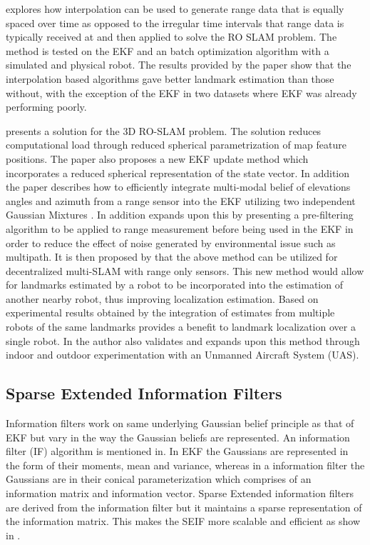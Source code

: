 \documentclass[conference]{IEEEtran}
\begin{document}
	
	
	
	\cite{Kehagias2006} explores how interpolation can be used to generate range data that is equally spaced over time as opposed to the irregular time intervals that range data is typically received at and then applied to solve the RO SLAM problem. The method is tested on the EKF and an batch optimization algorithm with a simulated and physical robot. The results provided by the paper show that the interpolation based algorithms gave better landmark estimation than those without, with the exception of the EKF in two datasets where EKF was already performing poorly.
	
	
	
	
	
	\cite{Fabresse2013} presents a solution for the 3D RO-SLAM problem. The solution reduces computational load through reduced spherical parametrization of map feature positions. The paper also proposes a new EKF update method which incorporates a reduced spherical representation of the state vector. In addition the paper describes how to efficiently integrate multi-modal belief of elevations angles and azimuth from a range sensor into the EKF utilizing two independent Gaussian Mixtures \cite{Fabresse2013}. In addition \cite{Fabresse2014} expands upon this by presenting a pre-filtering algorithm to be applied to range measurement before being used in the EKF in order to reduce the effect of noise generated by environmental issue such as multipath. It is then proposed by \cite{Fabresse2015} that the above method can be utilized for decentralized multi-SLAM with range only sensors. This new method would allow for landmarks estimated by a robot to be incorporated into the estimation of another nearby robot, thus improving localization estimation. Based on experimental results obtained by \cite{Fabresse2015} the integration of estimates from multiple robots of the same landmarks provides a benefit to landmark localization over a single robot. In \cite{Fabresse2016} the author also validates and expands upon this method through indoor and outdoor experimentation with an Unmanned Aircraft System (UAS).  
	
\subsection{Sparse Extended Information Filters}

Information filters work on same underlying Gaussian belief principle as that of EKF but vary in the way the Gaussian beliefs are represented. An information filter (IF) algorithm is mentioned in\cite{Torres-Gonzalez2014}. In EKF the Gaussians are represented in the form of their moments, mean and variance, whereas in a information filter the Gaussians are in their conical parameterization which comprises of an information matrix and information vector. 
Sparse Extended information filters are derived from the  information filter but it maintains a sparse representation of the information matrix. This makes the SEIF more scalable and efficient as show in \cite{Torres-Gonzalez2014}.
\end{document}
